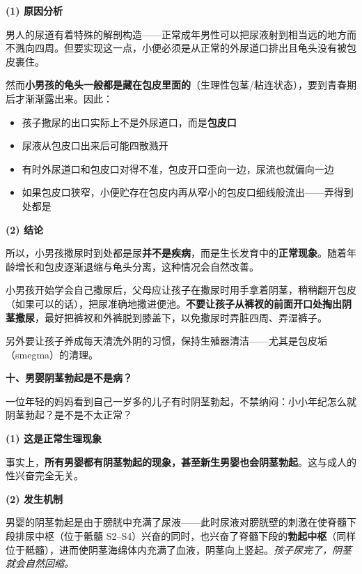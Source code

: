 \vspace{0.5em}
\noindent\textbf{(1) 原因分析}

男人的尿道有着特殊的解剖构造——正常成年男性可以把尿液射到相当远的地方而不溅向四周。但要实现这一点，小便必须是从正常的外尿道口排出且龟头没有被包皮裹住。

然而\textbf{小男孩的龟头一般都是藏在包皮里面的}（生理性包茎/粘连状态），要到青春期后才渐渐露出来。因此：
\begin{itemize}
	\item 孩子撒尿的出口实际上不是外尿道口，而是\textbf{包皮口}
	\item 尿液从包皮口出来后可能四散溅开
	\item 有时外尿道口和包皮口对得不准，包皮开口歪向一边，尿流也就偏向一边
	\item 如果包皮口狭窄，小便贮存在包皮内再从窄小的包皮口细线般流出——弄得到处都是
\end{itemize}

\vspace{0.3em}
\noindent\textbf{(2) 结论}

所以，小男孩撒尿时到处都是尿\textbf{并不是疾病}，而是生长发育中的\textbf{正常现象}。随着年龄增长和包皮逐渐退缩与龟头分离，这种情况会自然改善。

\begin{tcolorbox}[colback=pink!5!white,colframe=red!50!black,title=贴心小叮咛]
小男孩开始学会自己撒尿后，父母应让孩子在撒尿时用手拿着阴茎，稍稍翻开包皮（如果可以的话），把尿准确地撒进便池。\textbf{不要让孩子从裤衩的前面开口处掏出阴茎撒尿}，最好把裤衩和外裤脱到膝盖下，以免撒尿时弄脏四周、弄湿裤子。

另外要让孩子养成每天清洗外阴的习惯，保持生殖器清洁——尤其是包皮垢（smegma）的清理。
\end{tcolorbox}

\vspace{0.8em}
\noindent\textbf{十、男婴阴茎勃起是不是病？}

一位年轻的妈妈看到自己一岁多的儿子有时阴茎勃起，不禁纳闷：小小年纪怎么就阴茎勃起？是不是不太正常？

\vspace{0.5em}
\noindent\textbf{(1) 这是正常生理现象}

事实上，\textbf{所有男婴都有阴茎勃起的现象，甚至新生男婴也会阴茎勃起}。这与成人的性兴奋完全无关。

\vspace{0.3em}
\noindent\textbf{(2) 发生机制}

男婴的阴茎勃起是由于膀胱中充满了尿液——此时尿液对膀胱壁的刺激在使脊髓下段排尿中枢（位于骶髓 S2--S4）兴奋的同时，也兴奋了脊髓下段的\textbf{勃起中枢}（同样位于骶髓），进而使阴茎海绵体内充满了血液，阴茎向上竖起。\textit{孩子尿完了，阴茎就会自然回缩。}

